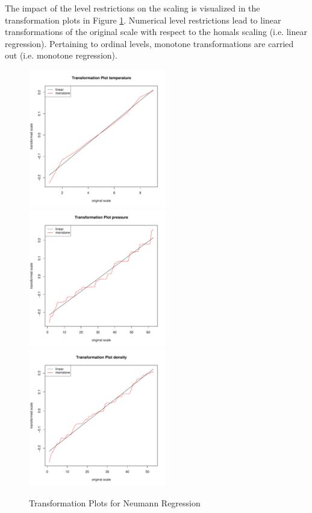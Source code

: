 \documentclass[article]{jss1}
\begin{document}
The impact of the level restrictions on the scaling is visualized in the transformation plots in Figure \ref{fig:neutrf}. Numerical level restrictions lead to linear transformations of the original scale with respect to the homals scaling (i.e. linear regression). Pertaining to ordinal levels, monotone transformations are carried out (i.e. monotone regression). 

\begin{figure}[hbt]
\begin{center}
\includegraphics[height=60mm, width=60mm]{neutrftemp.pdf}
\includegraphics[height=60mm, width=60mm]{neutrfpres.pdf}
\includegraphics[height=60mm, width=60mm]{neutrfdens.pdf}
\caption{\label{fig:neutrf}Transformation Plots for Neumann Regression}
\end{center}
\end{figure}
\end{document}
